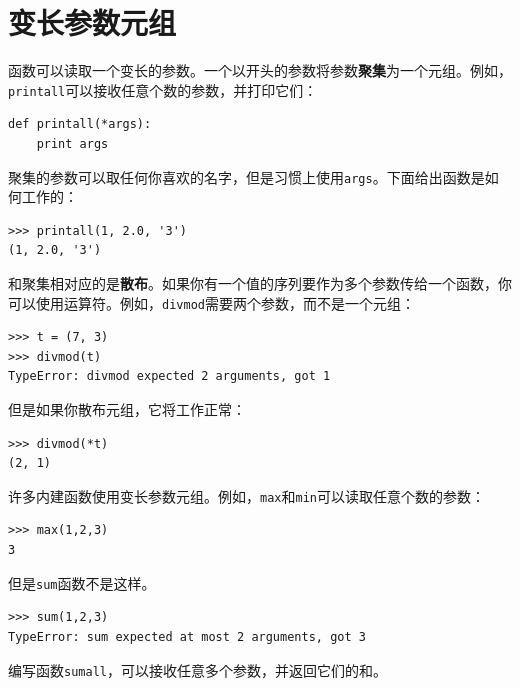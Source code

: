 

\section{变长参数元组}


函数可以读取一个变长的参数。一个以{\tt *}开头的参数将参数{\bf 聚集}为一个元组。例如，{\tt printall}可以接收任意个数的参数，并打印它们：

\beforeverb
\begin{verbatim}
def printall(*args):
    print args
\end{verbatim}
\afterverb
%
聚集的参数可以取任何你喜欢的名字，但是习惯上使用{\tt args}。下面给出函数是如何工作的：

\beforeverb
\begin{verbatim}
>>> printall(1, 2.0, '3')
(1, 2.0, '3')
\end{verbatim}
\afterverb
%
和聚集相对应的是{\bf 散布}。如果你有一个值的序列要作为多个参数传给一个函数，你可以使用{\tt *}运算符。例如，{\tt divmod}需要两个参数，而不是一个元组：



\beforeverb
\begin{verbatim}
>>> t = (7, 3)
>>> divmod(t)
TypeError: divmod expected 2 arguments, got 1
\end{verbatim}
\afterverb
%
但是如果你散布元组，它将工作正常：

\beforeverb
\begin{verbatim}
>>> divmod(*t)
(2, 1)
\end{verbatim}
\afterverb
%
\begin{ex}
许多内建函数使用变长参数元组。例如，{\tt max}和{\tt min}可以读取任意个数的参数：


\beforeverb
\begin{verbatim}
>>> max(1,2,3)
3
\end{verbatim}
\afterverb
%
但是{\tt sum}函数不是这样。


\beforeverb
\begin{verbatim}
>>> sum(1,2,3)
TypeError: sum expected at most 2 arguments, got 3
\end{verbatim}
\afterverb
%
编写函数{\tt sumall}，可以接收任意多个参数，并返回它们的和。

\end{ex}


